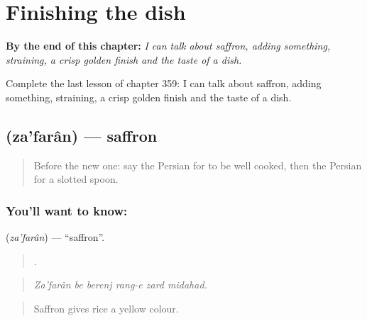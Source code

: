 
\chapter{Finishing the dish}
\label{ch:fa-finishing-the-dish}

\begin{chapteropening}
\textbf{By the end of this chapter:} \emph{I can talk about saffron, adding something, straining, a crisp golden finish and the taste of a dish.}

Complete the last lesson of chapter 359: I can talk about saffron, adding something, straining, a crisp golden finish and the taste of a dish.
\end{chapteropening}

\section[\texorpdfstring{\fa{زعفران} (za'farân)}{زعفران (za'farân)}]{ (za'farân) — saffron}

\label{lesson:FA-C359-zafaran}



\begin{quote}
Before the new one: say the Persian for to be well cooked, then the Persian for a slotted spoon.
\end{quote}

\subsection*{You'll want to know: }
\textbf{} (\emph{za'farân}) — \textquotedblleft{}saffron\textquotedblright{}.

\begin{quote}
     .
\end{quote}

\begin{quote}
\emph{Za'farân be berenj rang-e zard midahad.}
\end{quote}

\begin{quote}
Saffron gives rice a yellow colour.
\end{quote}

